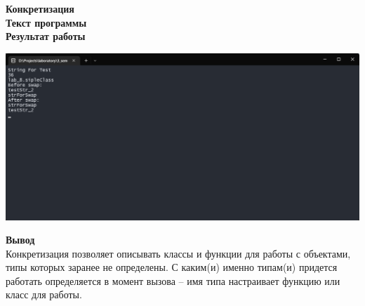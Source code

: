 \documentclass[12pt]{report}
\begin{document}
    \textbf{\large{Конкретизация}}\\
    \textbf{Текст программы}\\
    
    \vspace{0.4in}
    \newpage
    \textbf{Результат работы}\\
    \begin{center}
        \includegraphics[scale=0.5]{formal/lab_8.png}\\
    \end{center}

    \textbf{Вывод}\\
    Конкретизация позволяет описывать классы и функции для работы с объектами, 
    типы которых заранее не определены. С каким(и) именно типам(и) придется работать 
    определяется в момент вызова – имя типа настраивает функцию или класс для работы.
\end{document}
